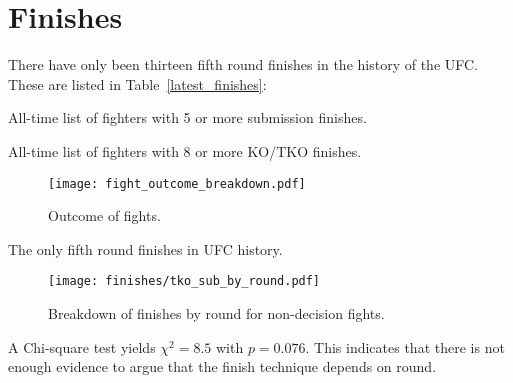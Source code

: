 \clearpage
\section*{Finishes}

There have only been thirteen fifth round finishes in the history of the UFC.
These are listed in Table~\ref{latest_finishes}:

\begin{center}
\begin{table}[h]

\caption{All-time list of fighters with 5 or more submission finishes.}
\end{table}
\end{center}

\begin{center}
\begin{table}[h]

\caption{All-time list of fighters with 8 or more KO/TKO finishes.}
\end{table}
\end{center}

\begin{figure}[h]
\begin{center}
\texttt{[image: fight\_outcome\_breakdown.pdf]}
\caption{Outcome of fights.}
\end{center}
\end{figure}

\begin{center}
\begin{table}[h]

\caption{The only fifth round finishes in UFC history.}
\label{latest_finishes}
\end{table}
\end{center}

\begin{figure}[h]
\begin{center}
\texttt{[image: finishes/tko\_sub\_by\_round.pdf]}
\caption{Breakdown of finishes by round for non-decision fights.}
\label{height_reach_all_fighters}
\end{center}
\end{figure}

A Chi-square test yields $\chi^2=8.5$ with $p=0.076$. This indicates
that there is not enough evidence to argue that the finish technique
depends on round.
